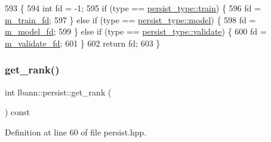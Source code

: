 \begin{DoxyCode}
593                                                 \{
594   \textcolor{keywordtype}{int} fd = -1;
595   \textcolor{keywordflow}{if} (type == \hyperlink{namespacelbann_adee41f31f15f3906cbdcce4a1417eb56a61b3a8faa9c1091806675c230a9abe64}{persist\_type::train}) \{
596     fd = \hyperlink{classlbann_1_1persist_a817671390811dde04670c47139402f51}{m\_train\_fd};
597   \} \textcolor{keywordflow}{else} \textcolor{keywordflow}{if} (type == \hyperlink{namespacelbann_adee41f31f15f3906cbdcce4a1417eb56a20f35e630daf44dbfa4c3f68f5399d8c}{persist\_type::model}) \{
598     fd = \hyperlink{classlbann_1_1persist_a1adc7102c1b4bc91534ca156decbd965}{m\_model\_fd};
599   \} \textcolor{keywordflow}{else} \textcolor{keywordflow}{if} (type == \hyperlink{namespacelbann_adee41f31f15f3906cbdcce4a1417eb56af9ab05454998236921a6b0e281fae632}{persist\_type::validate}) \{
600     fd = \hyperlink{classlbann_1_1persist_a87927d03b0cf684023178f997c038783}{m\_validate\_fd};
601   \}
602   \textcolor{keywordflow}{return} fd;
603 \}
\end{DoxyCode}
\mbox{\label{classlbann_1_1persist_a34eb918a890ab49dcbeedddf27ec1616}} 
\subsubsection{\texorpdfstring{get\+\_\+rank()}{get\_rank()}}
{\footnotesize\ttfamily int lbann\+::persist\+::get\+\_\+rank (\begin{DoxyParamCaption}{ }\end{DoxyParamCaption}) const\hspace{0.3cm}{\ttfamily [inline]}}



Definition at line 60 of file persist.\+hpp.



